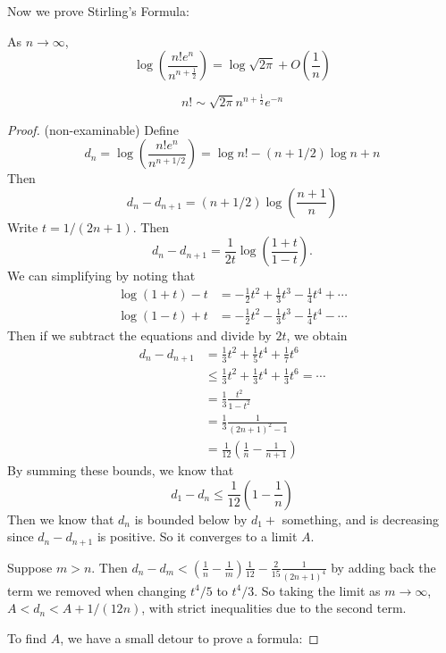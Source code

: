 \documentclass[a4paper]{article}
\begin{document}
Now we prove Stirling's Formula:
\begin{thm}
  As $n\to \infty$,
  \[
    \log\left(\frac{n! e^n}{n^{n + \frac{1}{2}}}\right) = \log \sqrt{2\pi} + O\left(\frac{1}{n}\right)
  \]
\end{thm}
\begin{cor}
  \[
    n!\sim \sqrt{2\pi}n^{n + \frac{1}{2}} e^{-n}
  \]
\end{cor}
\begin{proof}(non-examinable)
  Define 
  \[
    d_n = \log \left(\frac{n!e^n}{n^{n + 1/2}}\right) = \log n! - (n + 1/2)\log n + n
  \]
  Then
  \[
    d_n - d_{n + 1} = (n + 1/2)\log\left(\frac{n + 1}{n}\right)
  \]
  Write $t = 1/(2n + 1)$. Then
  \[
    d_n - d_{n + 1} = \frac{1}{2t}\log\left(\frac{1 + t}{1 - t}\right).
  \]
  We can simplifying by noting that
  \begin{align*}
    \log (1 + t) - t &= -\frac{1}{2}t^2 + \frac{1}{3}t^3 - \frac{1}{4}t^4 + \cdots\\
    \log (1 - t) + t &= -\frac{1}{2}t^2 - \frac{1}{3}t^3 - \frac{1}{4}t^4 - \cdots
  \end{align*}
  Then if we subtract the equations and divide by $2t$, we obtain
  \begin{align*}
    d_n - d_{n + 1} &= \frac{1}{3}t^2 + \frac{1}{5}t^4 + \frac{1}{7}t^6\\
    &\leq \frac{1}{3}t^2 + \frac{1}{3}t^4 + \frac{1}{3}t^6 = \cdots\\
    &= \frac{1}{3}\frac{t^2}{1 - t^2}\\
    &= \frac{1}{3}\frac{1}{(2n + 1)^2 - 1}\\
    &= \frac{1}{12}\left(\frac{1}{n} - \frac{1}{n + 1}\right)
  \end{align*}
  By summing these bounds, we know that
  \[
    d_1 - d_n \leq \frac{1}{12}\left(1 - \frac{1}{n}\right)
  \]
  Then we know that $d_n$ is bounded below by $d_1 +$ something, and is decreasing since $d_n - d_{n + 1}$ is positive. So it converges to a limit $A$.

  Suppose $m > n$. Then $d_n - d_m < \left(\frac{1}{n} - \frac{1}{m}\right)\frac{1}{12} - \frac{2}{15}\frac{1}{(2n + 1)^4}$ by adding back the term we removed when changing $t^4/5$ to $t^4/3$. So taking the limit as $m\to \infty$, $A < d_n < A + 1/(12n)$, with strict inequalities due to the second term.

  To find $A$, we have a small detour to prove a formula:


\end{proof}
\end{document}

